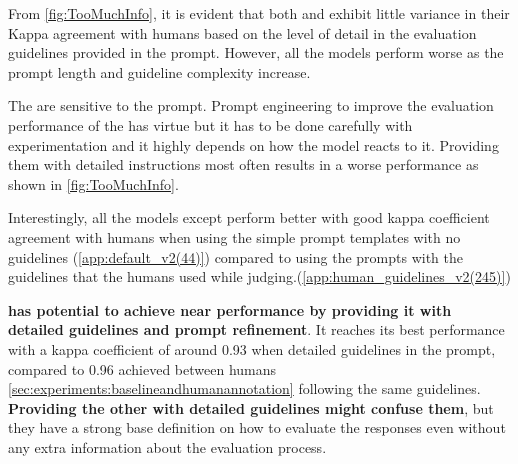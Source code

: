 
From \cref{fig:TooMuchInfo}, it is evident that both  and  exhibit little variance in their Kappa agreement with humans based on the level of detail in the evaluation guidelines provided in the prompt. However, all the  models perform worse as the prompt length and guideline complexity increase.

The \judgemodels are sensitive to the prompt. Prompt engineering to improve the evaluation performance of the \judgemodels has virtue but it has to be done carefully with experimentation and it highly depends on how the model reacts to it. Providing them with detailed instructions most often results in a worse performance as shown in \cref{fig:TooMuchInfo}. 

Interestingly, all the models except  perform better with good kappa coefficient agreement with humans when using the simple prompt templates with no guidelines (\cref{app:default_v2(44)}) compared to using the prompts with the guidelines that the humans used while judging.(\cref{app:human_guidelines_v2(245)})

\textbf{ has potential to achieve near  performance by providing it with detailed guidelines and prompt refinement}. It reaches its best performance with a kappa coefficient of around 0.93 when detailed guidelines in the prompt, compared to 0.96 achieved between humans \cref{sec:experiments:baselineandhumanannotation} following the same guidelines. \textbf{Providing the other \judgemodels with detailed guidelines might confuse them}, but they have a strong base definition on how to evaluate the responses even without any extra information about the evaluation process.


